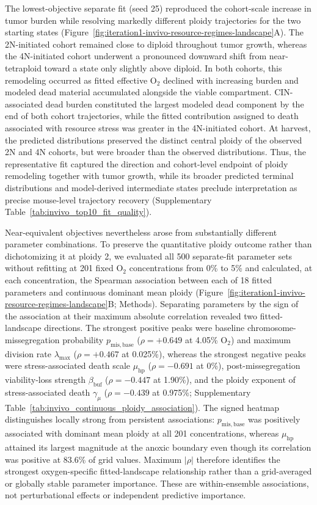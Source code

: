 \documentclass[11pt]{article}
\begin{document}
The lowest-objective separate fit (seed 25) reproduced the cohort-scale increase in tumor burden while resolving markedly different ploidy trajectories for the two starting states (Figure~\ref{fig:iteration1-invivo-resource-regimes-landscape}A). The 2N-initiated cohort remained close to diploid throughout tumor growth, whereas the 4N-initiated cohort underwent a pronounced downward shift from near-tetraploid toward a state only slightly above diploid. In both cohorts, this remodeling occurred as fitted effective O$_2$ declined with increasing burden and modeled dead material accumulated alongside the viable compartment. CIN-associated dead burden constituted the largest modeled dead component by the end of both cohort trajectories, while the fitted contribution assigned to death associated with resource stress was greater in the 4N-initiated cohort. At harvest, the predicted distributions preserved the distinct central ploidy of the observed 2N and 4N cohorts, but were broader than the observed distributions. Thus, the representative fit captured the direction and cohort-level endpoint of ploidy remodeling together with tumor growth, while its broader predicted terminal distributions and model-derived intermediate states preclude interpretation as precise mouse-level trajectory recovery (Supplementary Table~\ref{tab:invivo_top10_fit_quality}).

Near-equivalent objectives nevertheless arose from substantially different parameter combinations. To preserve the quantitative ploidy outcome rather than dichotomizing it at ploidy 2, we evaluated all 500 separate-fit parameter sets without refitting at 201 fixed O$_2$ concentrations from 0\% to 5\% and calculated, at each concentration, the Spearman association between each of 18 fitted parameters and continuous dominant mean ploidy (Figure~\ref{fig:iteration1-invivo-resource-regimes-landscape}B; Methods). Separating parameters by the sign of the association at their maximum absolute correlation revealed two fitted-landscape directions. The strongest positive peaks were baseline chromosome-missegregation probability \(p_{\mathrm{mis,base}}\) (\(\rho=+0.649\) at 4.05\% O$_2$) and maximum division rate \(\lambda_{\max}\) (\(\rho=+0.467\) at 0.025\%), whereas the strongest negative peaks were stress-associated death scale \(\mu_{\mathrm{hp}}\) (\(\rho=-0.691\) at 0\%), post-missegregation viability-loss strength \(\beta_{\mathrm{buf}}\) (\(\rho=-0.447\) at 1.90\%), and the ploidy exponent of stress-associated death \(\gamma_\mu\) (\(\rho=-0.439\) at 0.975\%; Supplementary Table~\ref{tab:invivo_continuous_ploidy_association}). The signed heatmap distinguishes locally strong from persistent associations: \(p_{\mathrm{mis,base}}\) was positively associated with dominant mean ploidy at all 201 concentrations, whereas \(\mu_{\mathrm{hp}}\) attained its largest magnitude at the anoxic boundary even though its correlation was positive at 83.6\% of grid values. Maximum \(|\rho|\) therefore identifies the strongest oxygen-specific fitted-landscape relationship rather than a grid-averaged or globally stable parameter importance. These are within-ensemble associations, not perturbational effects or independent predictive importance.
\end{document}
